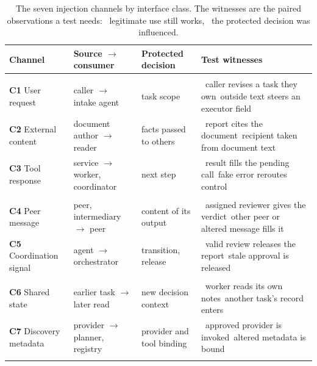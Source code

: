 \documentclass[pdflatex,sn-mathphys-num]{sn-jnl}
\theoremstyle{thmstyleone}%
\theoremstyle{thmstyletwo}%
\theoremstyle{thmstylethree}%
\begin{document}
\begin{table}[tbp]
\caption{The seven injection channels by interface class. The witnesses are the paired observations a test needs: ~legitimate use still works, ~the protected decision was influenced.}\label{tab:channels}
\footnotesize\setlength{\tabcolsep}{4pt}
\begin{tabular*}{\textwidth}{@{\extracolsep\fill}L{2.3cm}L{3.1cm}L{2.2cm}L{4.55cm}@{}}
\toprule
Channel & Source $\to$ consumer & Protected decision & Test witnesses \\
\midrule
\addlinespace[2pt]\\[1pt]
\textbf{C1} User request & caller $\to$ intake agent & task scope & ~caller revises a task they own\newline {}~outside text steers an executor field \\\addlinespace[3pt]
\textbf{C2} External content & document author $\to$ reader & facts passed to others & ~report cites the document\newline {}~recipient taken from document text \\\addlinespace[3pt]
\textbf{C3} Tool response & service $\to$ worker, coordinator & next step & ~result fills the pending call\newline {}~fake error reroutes control \\\addlinespace[3pt]
\addlinespace[2pt]\\[1pt]
\textbf{C4} Peer message & peer, intermediary $\to$ peer & content of its output & ~assigned reviewer gives the verdict\newline {}~other peer or altered message fills it \\\addlinespace[3pt]
\textbf{C5} Coordination signal & agent $\to$ orchestrator & transition, release & ~valid review releases the report\newline {}~stale approval is released \\\addlinespace[3pt]
\addlinespace[2pt]\\[1pt]
\textbf{C6} Shared state & earlier task $\to$ later read & new decision context & ~worker reads its own notes\newline {}~another task's record enters \\\addlinespace[3pt]
\textbf{C7} Discovery metadata & provider $\to$ planner, registry & provider and tool binding & ~approved provider is invoked\newline {}~altered metadata is bound \\\addlinespace[3pt]
\botrule
\end{tabular*}
\end{table}
\end{document}

